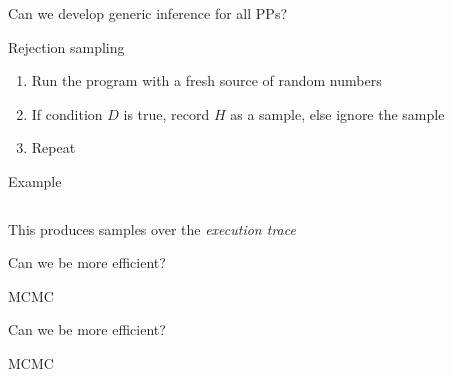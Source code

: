 \begin{frame}{Can we develop generic inference for all PPs?}
  \begin{block}{Rejection sampling}
    \begin{enumerate}
      \item Run the program with a fresh source of random numbers
      \item If condition $D$ is true, record $H$ as a sample, else ignore the sample
      \item Repeat
    \end{enumerate}
  \end{block}
  \begin{block}{Example}
    \begin{columns}
      \begin{column}{.4\textwidth}
        
      \end{column}
      \begin{column}{.4\textwidth}
        
      \end{column}
    \end{columns}
  \end{block}
  \begin{block}{This produces samples over the \emph{execution trace}}
    \eg 
  \end{block}
\end{frame}

\begin{frame}{Can we be more efficient?}
  \begin{block}{MCMC}
    
  \end{block}
\end{frame}

\begin{frame}{Can we be more efficient?}
  \begin{block}{MCMC}
    
  \end{block}
\end{frame}

